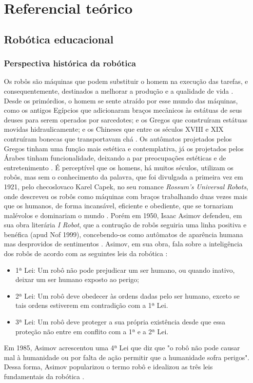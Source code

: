 \chapter{Referencial teórico}

\section{Robótica educacional}
\subsection{Perspectiva histórica da robótica}
Os robôs são máquinas que podem substituir o homem na execução das tarefas, e consequentemente, destinados a melhorar a produção e a qualidade de vida . Desde os primórdios, o homem se sente atraído por esse mundo das máquinas, como os antigos Egípcios que adicionaram braços mecânicos às estátuas de seus deuses para serem operados por sarcedotes; e os Gregos que construíram estátuas movidas hidraulicamente; e os Chineses que entre os séculos XVIII e XIX contruíram bonecas que transportavam chá \cite{santos2002robotica}.
Os autômatos projetados pelos Gregos tinham uma função mais estética e contemplativa, já os projetados pelos Árabes tinham funcionalidade, deixando a par preocupações estéticas e de entretenimento \cite{santos2002robotica}.
É perceptível que os homens, há muitos séculos, utilizam os robôs, mas sem o conhecimento da palavra, que foi divulgada a primeira vez em 1921, pelo checoslovaco Karel Capek, no seu romance \textit{Rossum's Universal Robots}, onde descreveu os robôs como máquinas com braços trabalhando duas vezes mais que os humanos, de forma incansável, eficiente e obediente, que se tornariam malévolos e dominariam o mundo \cite{santos2002robotica}. Porém em 1950, Isaac Asimov defendeu, em sua obra literária \textit{I Robot}, que a contrução de robôs seguiria uma linha positiva e benéfica (apud Nof 1999), concebendo-os como autômatos de aparência humana mas desprovidos de sentimentos \cite{santos2002robotica}.
Asimov, em sua obra, fala sobre a inteligência dos robôs de acordo com as seguintes leis da robótica \cite{santos2002robotica}:
\begin{itemize}
\item 1ª Lei: Um robô não pode prejudicar um ser humano, ou quando inativo, deixar um ser humano exposto ao perigo;
\item 2ª Lei: Um robô deve obedecer às ordens dadas pelo ser humano, exceto se tais ordens  estiverem em contradição com a 1ª Lei.
\item 3ª Lei: Um robô deve proteger a sua própria existência desde que essa proteção não entre em conflito com a 1ª e a 2ª Lei.
\end{itemize}
Em 1985, Asimov acrescentou uma 4ª Lei que diz que "o robô não pode causar mal à humanidade ou por falta de ação permitir que a humanidade sofra perigos". Dessa forma, Asimov popularizou o termo robô e idealizou as três leis fundamentais da robótica \cite{de2008utilizaccao}.

